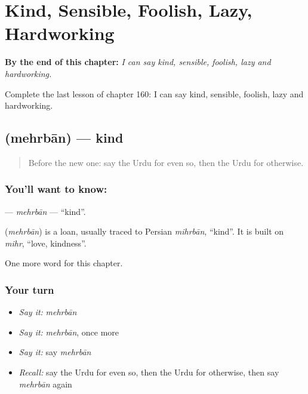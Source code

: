 
\chapter{Kind, Sensible, Foolish, Lazy, Hardworking}
\label{ch:ur-kind-sensible-foolish-lazy-hardworking}

\begin{chapteropening}
\textbf{By the end of this chapter:} \emph{I can say kind, sensible, foolish, lazy and hardworking.}

Complete the last lesson of chapter 160: I can say kind, sensible, foolish, lazy and hardworking.
\end{chapteropening}

\section[\texorpdfstring{\ur{مہربان} (mehrbān)}{مہربان (mehrbān)}]{ (mehrbān) — kind}

\label{lesson:UR-C160-mehrban}



\begin{quote}
Before the new one: say the Urdu for even so, then the Urdu for otherwise.
\end{quote}

\subsection*{You'll want to know: }
\textbf{} — \emph{mehrbān} — \textquotedblleft{}kind\textquotedblright{}.

\begin{cousinweb}
\textbf{} (\emph{mehrbān}) is a loan, usually traced to Persian \emph{mihrbān}, \textquotedblleft{}kind\textquotedblright{}. It is built on \emph{mihr}, \textquotedblleft{}love, kindness\textquotedblright{}.
\end{cousinweb}

\begin{grammarlens}[title={What you've built}]
One more word for this chapter.
\end{grammarlens}

\subsection*{Your turn}
\begin{itemize}
\raggedright
  \item \emph{Say it:} \emph{mehrbān}
  \item \emph{Say it:} \emph{mehrbān}, once more
  \item \emph{Say it:} say \emph{mehrbān}
  \item \emph{Recall:} say the Urdu for even so, then the Urdu for otherwise, then say \emph{mehrbān} again
\end{itemize}

